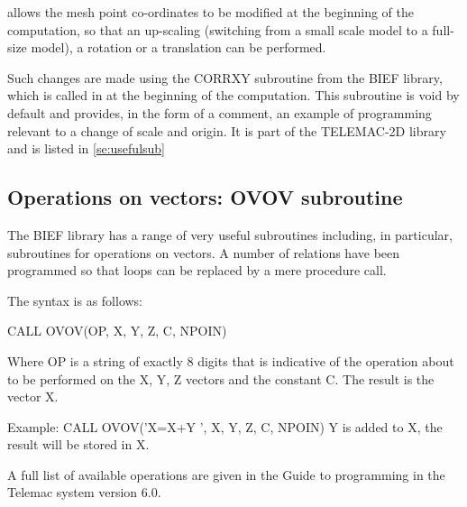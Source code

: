  \tomawac allows the mesh point co-ordinates to be modified at the beginning of the computation, so that an up-scaling (switching from a small scale model to a full-size model), a rotation or a translation can be performed.

 Such changes are made using the CORRXY subroutine from the BIEF library, which is called in at the beginning of the computation. This subroutine is void by default and provides, in the form of a comment, an example of programming relevant to a change of scale and origin. It is part of the TELEMAC-2D library and is listed in \ref{se:usefulsub}

\subsection{ Operations on vectors: OVOV subroutine }

 The BIEF library has a range of very useful subroutines including, in particular, subroutines for operations on vectors. A number of relations have been programmed so that loops can be replaced by a mere procedure call.

 The syntax is as follows:

 CALL OVOV(OP, X, Y, Z, C, NPOIN)

 Where OP is a string of exactly 8 digits that is indicative of the operation about to be performed on the X, Y, Z vectors and the constant C. The result is the vector X.

 Example:  CALL OVOV('X=X+Y ', X, Y, Z, C, NPOIN)  Y is added to X, the result will be stored in X.

 A full list of available operations are given in the Guide to programming in the Telemac system version 6.0.
